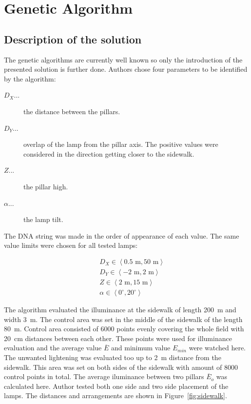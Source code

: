 \section{Genetic Algorithm}
\subsection{Description of the solution}
The genetic algorithms are currently well known so only the introduction of the presented solution is further done. Authors chose four parameters to be identified by the algorithm:

\begin{description}
	\item [$D_X$...] the distance between the pillars.
	\item [$D_Y$...] overlap of the lamp from the pillar axis. The positive values were considered in the direction getting closer to the sidewalk.
	\item [$Z$...] the pillar high.
	\item [$\alpha$...] the lamp tilt.
\end{description}

The DNA string was made in the order of appearance of each value. The same value limits were chosen for all tested lamps:

\begin{eqnarray}
&&D_X \in \left\langle 0.5 \text{ m}, 50 \text{ m}\right\rangle \label{eq:DXLim}\\
&&D_Y \in \left\langle -2 \text{ m}, 2 \text{ m}\right\rangle \\
&&Z \in \left\langle 2 \text{ m}, 15 \text{ m}\right\rangle \\
&&\alpha \in \left\langle 0^\circ, 20^\circ \right\rangle
\end{eqnarray}

The algorithm evaluated the illuminance at the sidewalk of length 200~m and width 3~m. The control area was set in the middle of the sidewalk of the length 80~m. Control area consisted of 6000 points evenly covering the whole field with 20~cm distances between each other. These points were used for illuminance evaluation and the average value $\overline{E}$ and minimum value $E_{min}$ were watched here. The unwanted lightening was evaluated too up to 2~m distance from the sidewalk. This area was set on both sides of the sidewalk with amount of 8000 control points in total. The average iluminance between two pillars $\overline{E}_o$ was calculated here. Author tested both one side and two side placement of the lamps. The distances and arrangements are shown in Figure~\ref{fig:sidewalk}.


